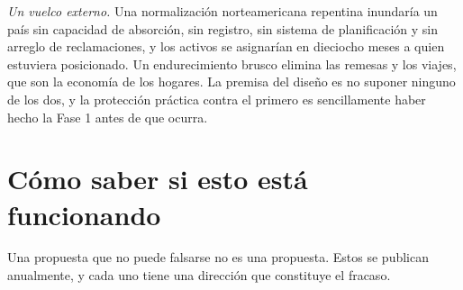 \emph{Un vuelco externo.} Una normalización norteamericana repentina inundaría un país sin capacidad
de absorción, sin registro, sin sistema de planificación y sin arreglo de reclamaciones, y los
activos se asignarían en dieciocho meses a quien estuviera posicionado. Un endurecimiento brusco
elimina las remesas y los viajes, que son la economía de los hogares. La premisa del diseño es no
suponer ninguno de los dos, y la protección práctica contra el primero es sencillamente haber hecho
la Fase 1 antes de que ocurra.

\section{Cómo saber si esto está funcionando}

Una propuesta que no puede falsarse no es una propuesta. Estos se publican anualmente, y cada uno
tiene una dirección que constituye el fracaso.

